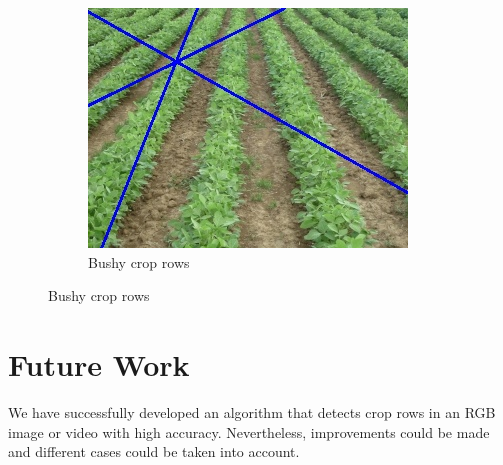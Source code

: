 \begin{figure}[H]
\begin{subfigure}{0.3\textwidth}
\end{subfigure}
\begin{subfigure}{0.3\textwidth}%
    \includegraphics[width=\textwidth]{Report/images/faultyransac.jpg}
    \caption{Bushy crop rows}
    \label{fig:missedcrop}

\end{subfigure}
\end{figure}
\label{pics: bushyremoval}






\section{Future Work}

We have successfully developed an algorithm that detects crop rows in an RGB image or video with high accuracy. Nevertheless, improvements could be made and different cases could be taken into account. 

